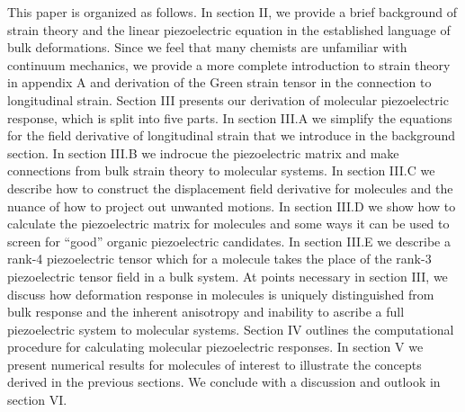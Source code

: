 This paper is organized as follows. In section II, we provide a brief background of strain theory and the linear
piezoelectric equation in the established language of bulk deformations. Since we feel that many chemists are unfamiliar
with continuum mechanics, we provide a more complete introduction to strain theory in appendix A and derivation of the Green strain tensor 
in the connection to longitudinal strain. Section III presents
our derivation of molecular piezoelectric response, which is split into five parts. 
In section III.A we simplify the equations for the field derivative of longitudinal strain that we introduce in the background section.
In section III.B we indrocue the piezoelectric matrix and make connections from bulk strain theory to 
molecular systems.
In section III.C we describe how to construct the displacement field derivative for molecules and the 
nuance of how to project out unwanted motions.
In section III.D we show how to calculate the piezoelectric matrix for molecules and some ways it can be used
to screen for ``good'' organic piezoelectric candidates.
In section III.E we describe a rank-4 piezoelectric tensor which for a molecule takes the place of the 
rank-3 piezoelectric tensor field in a bulk system.
At points necessary in section III, we discuss how deformation response in molecules is uniquely distinguished 
from bulk response and the inherent anisotropy and inability to ascribe a full piezoelectric system to molecular systems.
Section IV outlines the computational procedure for calculating molecular piezoelectric responses. 
In section V we present numerical results for molecules of interest to illustrate the concepts derived in the previous
sections. 
We conclude with a discussion and outlook in section VI. 
